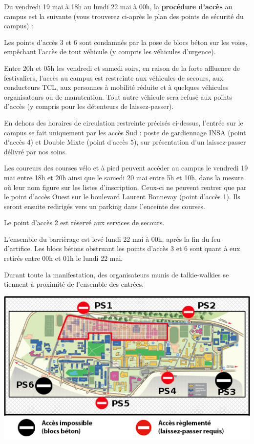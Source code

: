 \documentclass[hidelinks, paper=a4, fontsize=13pt]{report}
\begin{document}
Du vendredi 19 mai à 18h au lundi 22 mai à 00h, la \textbf{procédure d’accès} au campus est la suivante (vous trouverez ci-après le plan des points de sécurité du campus) :
\begin{list}{•}{}
	\item Les points d'accès 3 et 6 sont condamnés par la pose de blocs béton sur les voies, empêchant l'accès de tout véhicule (y compris les véhicules d'urgence).
	\item Entre 20h et 05h les vendredi et samedi soirs, en raison de la forte affluence de festivaliers, l'accès au campus est restreinte aux véhicules de secours, aux conducteurs TCL, aux personnes à mobilité réduite et à quelques véhicules organisateurs ou de manutention. Tout autre véhicule sera refusé aux points d'accès (y compris pour les détenteurs de laissez-passer).
	\item En dehors des horaires de circulation restreinte précisés ci-dessus, l’entrée sur le campus se fait uniquement par les accès Sud : poste de gardiennage INSA (point d'accès 4) et Double Mixte (point d'accès 5), sur présentation d’un laissez-passer délivré par nos soins. 
	\item Les coureurs des courses vélo et à pied peuvent accéder au campus le vendredi 19 mai entre 18h et 20h ainsi que le samedi 20 mai entre 5h et 10h, dans la mesure où leur nom figure sur les listes d’inscription. Ceux-ci ne peuvent rentrer que par le point d'accès Ouest sur le boulevard Laurent Bonnevay (point d'accès 1). Ils seront ensuite redirigés vers un parking dans l’enceinte des courses.
	\item Le point d'accès 2 est réservé aux services de secours.
	\item L’ensemble du barrièrage est levé lundi 22 mai à 00h, après la fin du feu d’artifice. Les blocs bétons obstruant les points d'accès 3 et 6 sont quant à eux retirés entre 00h et 01h le lundi 22 mai.
	\item Durant toute la manifestation, des organisateurs munis de talkie-walkies se tiennent à proximité de l’ensemble des entrées.
\end{list}

\begin{center}
	\includegraphics[scale=0.8]{Annexes/Plans/pointsSecu}
\end{center}
\end{document}
